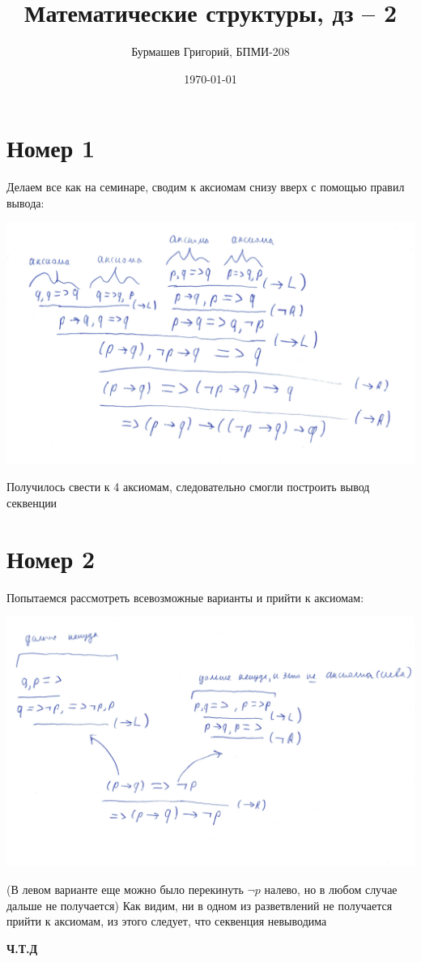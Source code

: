 \documentclass[a4paper,12pt]{article}
\author{Бурмашев Григорий, БПМИ-208}
\title{Математические структуры, дз -- 2}
\date{\today}
\begin{document}
\maketitle
\section*{Номер 1}
Делаем все как на семинаре, сводим к аксиомам снизу вверх с помощью правил вывода:
\begin{center}
\includegraphics[scale=0.4]{a1.png}
\end{center}
Получилось свести к 4 аксиомам, следовательно смогли построить вывод секвенции
\clearpage
\section*{Номер 2}
Попытаемся рассмотреть всевозможные варианты и прийти к аксиомам:
\begin{center}
\includegraphics[scale=0.6]{a2.png}
\end{center}
(В левом варианте еще можно было перекинуть $\neg p$ налево, но в любом случае дальше не получается)
Как видим, ни в одном из разветвлений не получается прийти к аксиомам, из этого следует, что секвенция невыводима
\begin{center}
\textbf{Ч.Т.Д} 
\end{center}
\end{document}
